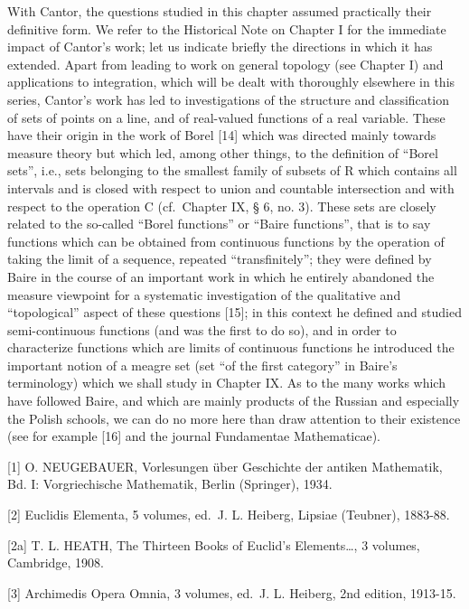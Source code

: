 With Cantor, the questions studied in this chapter assumed practically their definitive form. We refer to the Historical Note on Chapter I for the immediate impact of Cantor's work; let us indicate briefly the directions in which it has extended. Apart from leading to work on general topology (see Chapter I) and applications to integration, which will be dealt with thoroughly elsewhere in this series, Cantor's work has led to investigations of the structure and classification of sets of points on a line, and of real-valued functions of a real variable. These have their origin in the work of Borel {[}14{]} which was directed mainly towards measure theory but which led, among other things, to the definition of ``Borel sets'', i.e., sets belonging to the smallest family of subsets of R which contains all intervals and is closed with respect to union and countable intersection and with respect to the operation C (cf.~Chapter IX, § 6, no. 3). These sets are closely related to the so-called ``Borel functions'' or ``Baire functions'', that is to say functions which can be obtained from continuous functions by the operation of taking the limit of a sequence, repeated ``transfinitely''; they were defined by Baire in the course of an important work in which he entirely abandoned the measure viewpoint for a systematic investigation of the qualitative and ``topological'' aspect of these questions {[}15{]}; in this context he defined and studied semi-continuous functions (and was the first to do so), and in order to characterize functions which are limits of continuous functions he introduced the important notion of a meagre set (set ``of the first category'' in Baire's terminology) which we shall study in Chapter IX. As to the many works which have followed Baire, and which are mainly products of the Russian and especially the Polish schools, we can do no more here than draw attention to their existence (see for example {[}16{]} and the journal Fundamentae Mathematicae).


{[}1{]} O. NEUGEBAUER, Vorlesungen über Geschichte der antiken Mathematik, Bd. I: Vorgriechische Mathematik, Berlin (Springer), 1934.

{[}2{]} Euclidis Elementa, 5 volumes, ed.~J. L. Heiberg, Lipsiae (Teubner), 1883-88.

{[}2a{]} T. L. HEATH, The Thirteen Books of Euclid's Elements\ldots, 3 volumes, Cambridge, 1908.

{[}3{]} Archimedis Opera Omnia, 3 volumes, ed.~J. L. Heiberg, 2nd edition, 1913-15.

